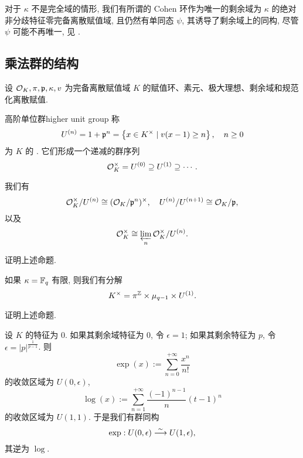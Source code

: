 \begin{remark}
对于 $\kappa$ 不是完全域的情形, 我们有所谓的 Cohen 环作为唯一的剩余域为 $\kappa$ 的绝对非分歧特征零完备离散赋值域, 且仍然有单同态 $\psi$, 其诱导了剩余域上的同构, 尽管 $\psi$ 可能不再唯一, 见 \cite[\S~0.2.4]{FontaineOuyang}.
\end{remark}

\subsection{乘法群的结构}
设 ${\mathcal{O}}_K,\pi,{\mathfrak{p}},\kappa, v$ 为完备离散赋值域 $K$ 的赋值环、素元、极大理想、剩余域和规范化离散赋值.

\begin{definition}{高阶单位群}{higher unit group}
称
  \[U^{(n)}=1+{\mathfrak{p}}^n=\left\{x\in K^\times\mid v(x-1)\ge n\right\},\quad n\ge 0\]
为 $K$ 的 . 它们形成一个递减的群序列 
  \[{\mathcal{O}}_K^\times=U^{(0)}\supseteq U^{(1)}\supseteq \cdots.\]
\end{definition}

\begin{proposition}{}{}
我们有
  \[{\mathcal{O}}_K^\times/U^{(n)}\cong ({\mathcal{O}}_K/{\mathfrak{p}}^n)^\times,\quad
U^{(n)}/U^{(n+1)}\cong {\mathcal{O}}_K/{\mathfrak{p}},\]
以及
  \[{\mathcal{O}}_K^\times\cong\varprojlim\limits\limits_n {\mathcal{O}}_K^\times/U^{(n)}.\]
\end{proposition}
\begin{exercise}
证明上述命题.
\end{exercise}

\begin{proposition}{}{}
如果 $\kappa={\mathbb{F}}_q$ 有限, 则我们有分解
  \[K^\times=\pi^{\mathbb{Z}}\times \mu_{q-1}\times U^{(1)}.\]
\end{proposition}
\begin{exercise}
证明上述命题.
\end{exercise}

\begin{exercise}
设 $K$ 的特征为 $0$. 如果其剩余域特征为 $0$, 令 $\epsilon=1$; 如果其剩余特征为 $p$, 令 $\epsilon=|p|^{\frac{1}{p-1}}$. 则 
  \[\exp(x):=\sum_{n=0}^{+\infty}\frac{x^n}{n!}\]
的收敛区域为 $U(0,\epsilon)$,
  \[\log(x):=\sum_{n=1}^{+\infty}\frac{(-1)^{n-1}}{n}(t-1)^n\]
的收敛区域为 $U(1,1)$.
于是我们有群同构
  \[\exp:U(0,\epsilon)\stackrel{\sim}{\longrightarrow} U(1,\epsilon),\]
其逆为 $\log$.
\end{exercise}

